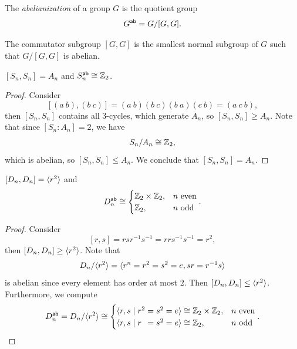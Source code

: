 \begin{definition}
  The \emph{abelianization} of a group \(G\) is the quotient group \[
    G^{\mathsf{ab}} = G/[G,G].
  \]
\end{definition}

\begin{proposition}
  The commutator subgroup \([G,G]\) is the smallest normal subgroup of \(G\) such that \(G/[G,G]\) is abelian.
\end{proposition}

\begin{example}
  \([S_n,S_n] = A_n\) and \(S_n^{\mathsf{ab}} \cong \mathbb{Z}_2\).
\end{example}
\begin{proof}
  Consider \[
    [(a\ b),(b\ c)] = (a\ b)(b\ c)(b\ a)(c\ b) = (a\ c\ b),
  \] then \([S_n,S_n]\) contains all \(3\)-cycles, which generate \(A_n\), so \([S_n,S_n]\geq A_n\). Note that since \([S_n:A_n] = 2\), we have \[
    S_n / A_n \cong \mathbb{Z}_2,
  \] which is abelian, so \([S_n,S_n]\leq A_n\). We conclude that \([S_n,S_n] = A_n\).
\end{proof}

\begin{example}
  \([D_n,D_n] = \langle r^2\rangle\) and \[
    D_n^{\mathsf{ab}} \cong \begin{cases}
      \mathbb{Z}_2\times\mathbb{Z}_2, & n \text{ even} \\
      \mathbb{Z}_2, & n \text{ odd}
    \end{cases}.
  \]
\end{example}
\begin{proof}
  Consider \[
    [r,s] = rsr^{-1}s^{-1} = rrs^{-1}s^{-1} = r^2,
  \] then \([D_n,D_n]\geq \langle r^2\rangle\).
  Note that \begin{align*}
    D_n/\langle r^2\rangle = \langle r^n = r^2 = s^2 = e, sr = r^{-1}s\rangle
  \end{align*} is abelian since every element has order at most \(2\). Then \([D_n,D_n] \leq \langle r^2\rangle\).
  Furthermore, we compute \begin{align*}
    D_n^{\mathsf{ab}} = D_n/\langle r^2\rangle \cong \begin{cases}
      \langle r,s \mid r^2 = s^2 = e\rangle \cong \mathbb{Z}_2\times\mathbb{Z}_2, & n \text{ even} \\
      \langle r,s \mid r\phantom{^2} = s^2 = e\rangle \cong \mathbb{Z}_2, & n \text{ odd}
    \end{cases}.
  \end{align*}
\end{proof}

